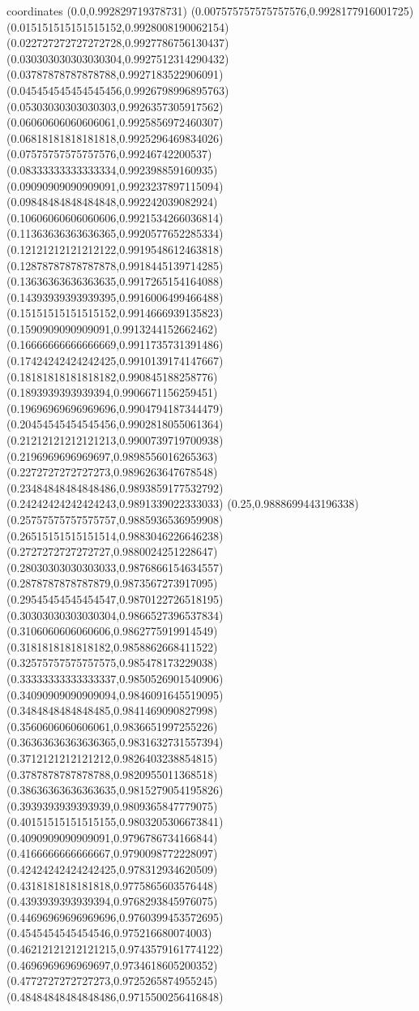 coordinates {%
(0.0,0.992829719378731)
(0.007575757575757576,0.9928177916001725)
(0.015151515151515152,0.9928008190062154)
(0.022727272727272728,0.9927786756130437)
(0.030303030303030304,0.9927512314290432)
(0.03787878787878788,0.9927183522906091)
(0.045454545454545456,0.9926798996895763)
(0.05303030303030303,0.9926357305917562)
(0.06060606060606061,0.9925856972460307)
(0.06818181818181818,0.9925296469834026)
(0.07575757575757576,0.99246742200537)
(0.08333333333333334,0.992398859160935)
(0.09090909090909091,0.9923237897115094)
(0.09848484848484848,0.992242039082924)
(0.10606060606060606,0.9921534266036814)
(0.11363636363636365,0.9920577652285334)
(0.12121212121212122,0.9919548612463818)
(0.12878787878787878,0.9918445139714285)
(0.13636363636363635,0.9917265154164088)
(0.14393939393939395,0.9916006499466488)
(0.15151515151515152,0.9914666939135823)
(0.1590909090909091,0.9913244152662462)
(0.16666666666666669,0.9911735731391486)
(0.17424242424242425,0.9910139174147667)
(0.18181818181818182,0.990845188258776)
(0.1893939393939394,0.9906671156259451)
(0.19696969696969696,0.9904794187344479)
(0.20454545454545456,0.9902818055061364)
(0.21212121212121213,0.9900739719700938)
(0.2196969696969697,0.9898556016265363)
(0.2272727272727273,0.9896263647678548)
(0.23484848484848486,0.9893859177532792)
(0.24242424242424243,0.9891339022333033)
(0.25,0.9888699443196338)
(0.25757575757575757,0.9885936536959908)
(0.26515151515151514,0.9883046226646238)
(0.2727272727272727,0.9880024251228647)
(0.28030303030303033,0.9876866154634557)
(0.2878787878787879,0.9873567273917095)
(0.29545454545454547,0.9870122726518195)
(0.30303030303030304,0.9866527396537834)
(0.3106060606060606,0.9862775919914549)
(0.3181818181818182,0.9858862668411522)
(0.32575757575757575,0.985478173229038)
(0.33333333333333337,0.9850526901540906)
(0.34090909090909094,0.9846091645519095)
(0.3484848484848485,0.9841469090827998)
(0.3560606060606061,0.9836651997255226)
(0.36363636363636365,0.9831632731557394)
(0.3712121212121212,0.9826403238854815)
(0.3787878787878788,0.9820955011368518)
(0.38636363636363635,0.9815279054195826)
(0.3939393939393939,0.9809365847779075)
(0.40151515151515155,0.9803205306673841)
(0.4090909090909091,0.9796786734166844)
(0.4166666666666667,0.9790098772228097)
(0.42424242424242425,0.978312934620509)
(0.4318181818181818,0.9775865603576448)
(0.4393939393939394,0.9768293845976075)
(0.44696969696969696,0.9760399453572695)
(0.4545454545454546,0.975216680074003)
(0.46212121212121215,0.9743579161774122)
(0.4696969696969697,0.9734618605200352)
(0.4772727272727273,0.9725265874955245)
(0.48484848484848486,0.9715500256416848)
}
